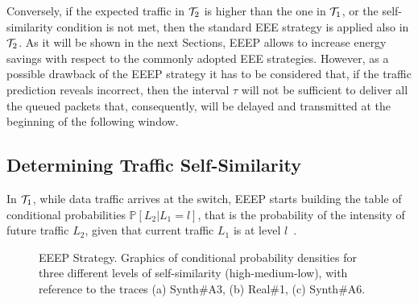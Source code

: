 \documentclass[journal,10pt,twoside,final]{IEEEtran}
\begin{document}
Conversely, if the expected traffic in ${\cal T}_2$ is higher than the one in ${\cal T}_1$, or the self-similarity condition is not met, then the standard EEE strategy is applied also in ${\cal T}_2$.
As it will be shown in the next Sections, EEEP allows to increase energy savings with respect to the commonly adopted EEE strategies. However, as a possible drawback of the EEEP strategy it has to be considered that, if the traffic prediction reveals incorrect, then the interval $\tau$ will not be sufficient to deliver all the queued packets that, consequently, will be delayed and transmitted at the beginning of the following window. 


\subsection{Determining Traffic Self-Similarity}
\label{subsec:EEEP-self}
In ${\cal T}_1$, while data traffic arrives at the switch, EEEP starts building the table of conditional probabilities ${\mathbb P}[L_2 | L_1=l]$, that is the probability of the intensity of future traffic $L_2$, given that current traffic $L_1$ is at level $l$~\cite{ParkWillinger00}.
\begin{figure*}[!ht]
\centering
{}
\caption{EEEP Strategy. Graphics of conditional probability densities for three different levels of self-similarity (high-medium-low), with reference to the traces (a) Synth\#A3, (b) Real\#1, (c) Synth\#A6.}
\label{fig:CPD}
\end{figure*}
\end{document}
